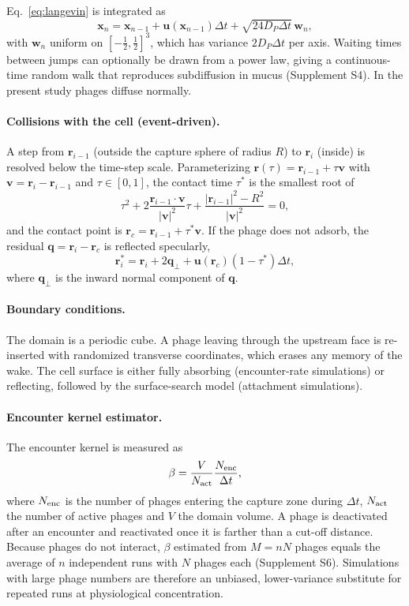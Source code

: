 \documentclass[12pt]{article}
\begin{document}
Eq.~\eqref{eq:langevin} is integrated as
\begin{equation}
\bm x_{n}=\bm x_{n-1}+\bm u(\bm x_{n-1})\Delta t+\sqrt{24D_P\Delta t}\,\bm w_n,
\end{equation}
with $\bm w_n$ uniform on $[-\tfrac12,\tfrac12]^3$, which has variance $2D_P\Delta t$ per axis\cite{grassia1995computer}. Waiting times between jumps can optionally be drawn from a power law, giving a continuous-time random walk that reproduces subdiffusion in mucus\cite{metzler2000random,joiner2019impact} (Supplement S4). In the present study phages diffuse normally.

\paragraph{Collisions with the cell (event-driven).} A step from $\bm r_{i-1}$ (outside the capture sphere of radius $R$) to $\bm r_i$ (inside) is resolved below the time-step scale. Parameterizing $\bm r(\tau)=\bm r_{i-1}+\tau\bm v$ with $\bm v=\bm r_i-\bm r_{i-1}$ and $\tau\in[0,1]$, the contact time $\tau^*$ is the smallest root of
\begin{equation}
\tau^2+2\frac{\bm r_{i-1}\cdot\bm v}{|\bm v|^2}\tau+\frac{|\bm r_{i-1}|^2-R^2}{|\bm v|^2}=0,
\end{equation}
and the contact point is $\bm r_c=\bm r_{i-1}+\tau^*\bm v$. If the phage does not adsorb, the residual $\bm q=\bm r_i-\bm r_c$ is reflected specularly,
\begin{equation}
\bm r_i^{*}=\bm r_i+2\bm q_\perp+\bm u(\bm r_c)(1-\tau^*)\Delta t ,
\end{equation}
where $\bm q_\perp$ is the inward normal component of $\bm q$.

\paragraph{Boundary conditions.} The domain is a periodic cube. A phage leaving through the upstream face is re-inserted with randomized transverse coordinates, which erases any memory of the wake. The cell surface is either fully absorbing (encounter-rate simulations) or reflecting, followed by the surface-search model (attachment simulations).

\paragraph{Encounter kernel estimator.} The encounter kernel is measured as
\begin{equation}\label{eq:beta_est}
\beta=\frac{V}{N_{\rm act}}\frac{N_{\rm enc}}{\Delta t},
\end{equation}
where $N_{\rm enc}$ is the number of phages entering the capture zone during $\Delta t$, $N_{\rm act}$ the number of active phages and $V$ the domain volume. A phage is deactivated after an encounter and reactivated once it is farther than a cut-off distance. Because phages do not interact, $\beta$ estimated from $M=nN$ phages equals the average of $n$ independent runs with $N$ phages each (Supplement S6). Simulations with large phage numbers are therefore an unbiased, lower-variance substitute for repeated runs at physiological concentration.
\end{document}
